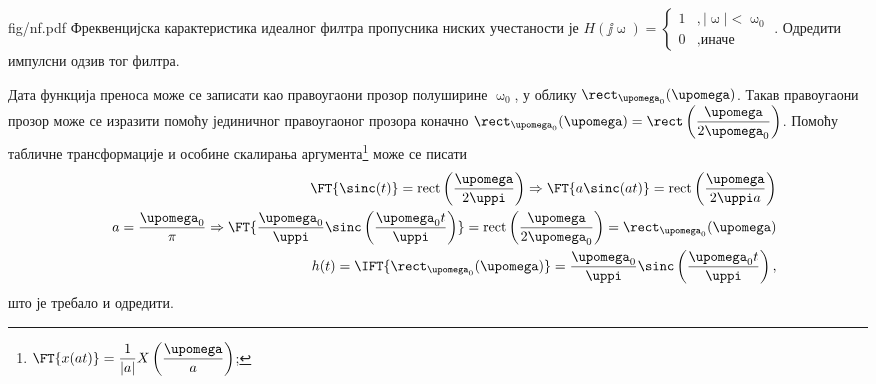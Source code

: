 \begin{slikaDesno}{fig/nf.pdf}
\PID \label{z:lpf}
Фреквенцијска карактеристика идеалног филтра пропусника ниских учестаности је 
$H(\jj\upomega) = 
\begin{cases}
    1 &, |\upomega| < \upomega_0 \\
    0 &, \text{иначе}
\end{cases}.$ Одредити импулсни одзив тог филтра. 
\end{slikaDesno}

\RESENJE 

Дата функција преноса може се записати као правоугаони прозор полуширине 
$\upomega_0$, у облику $\rect_{\upomega_0}(\upomega)$.
Такав правоугаони прозор може се изразити помоћу јединичног правоугаоног прозора коначно
$\rect_{\upomega_0}(\upomega) = \rect \left( \dfrac{\upomega}{2\upomega_0} \right)$.
Помоћу табличне трансформације  и особине скалирања аргумента\footnote{
    $\FT{x(at)} = \dfrac{1}{|a|} X\left( \dfrac{\upomega}{a} \right)$;
} може се писати
\begin{eqnarray}
    && \FT{ \sinc(t) } = \mathrm{rect}\left(\frac{\upomega}{2\uppi}\right)
    \Rightarrow
    \FT{ a \sinc(at) } = \mathrm{rect}\left(\frac{\upomega}{2\uppi a}\right) \\ 
    && a = \dfrac{\upomega_0}{\pi} \Rightarrow
    \FT{ \dfrac{\upomega_0}{\uppi} \sinc \left( \dfrac{\upomega_0 t}{\uppi} \right) } = \mathrm{rect}\left(\frac{\upomega}{2 \upomega_0}\right) 
    =   \rect_{\upomega_0} (\upomega) \\ 
    && 
    h(t) 
    = 
    \IFT{ \rect_{\upomega_0} (\upomega)  } = \dfrac{\upomega_0}{\uppi} \sinc \left( \dfrac{\upomega_0 t}{\uppi} \right),
\end{eqnarray}
што је требало и одредити. 
